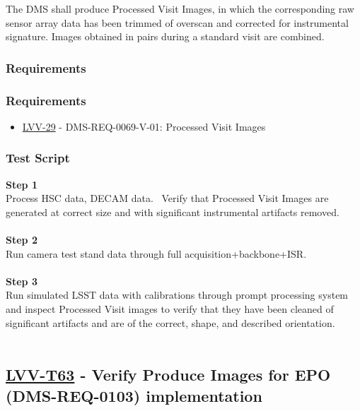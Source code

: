 The DMS shall produce Processed Visit Images, in which the corresponding
raw sensor array data has been trimmed of overscan and corrected for
instrumental signature. Images obtained in pairs during a standard visit
are combined.

\hypertarget{requirements-52}{%
\subsubsection{Requirements}\label{requirements-52}}

\hypertarget{requirements-53}{%
\subsubsection{Requirements}\label{requirements-53}}

\begin{itemize}
\tightlist
\item
  \href{https://jira.lsstcorp.org/browse/LVV-29}{LVV-29} -
  DMS-REQ-0069-V-01: Processed Visit Images
\end{itemize}

\hypertarget{test-script-26}{%
\subsubsection{Test Script}\label{test-script-26}}

\textbf{Step 1}\\
Process HSC data, DECAM data. ~Verify that Processed Visit Images are
generated at correct size and with significant instrumental artifacts
removed.\\
~\\
\textbf{Step 2}\\
Run camera test stand data through full acquisition+backbone+ISR.\\
~\\
\textbf{Step 3}\\
Run simulated LSST data with calibrations through prompt processing
system and inspect Processed Visit images to verify that they have been
cleaned of significant artifacts and are of the correct, shape, and
described orientation.\\
~\\

\hypertarget{lvv-t63---verify-produce-images-for-epo-dms-req-0103-implementation}{%
\subsection{\texorpdfstring{\href{https://jira.lsstcorp.org/secure/Tests.jspa\#/testCase/LVV-T63}{LVV-T63}
- Verify Produce Images for EPO (DMS-REQ-0103)
implementation}{LVV-T63 - Verify Produce Images for EPO (DMS-REQ-0103) implementation}}\label{lvv-t63---verify-produce-images-for-epo-dms-req-0103-implementation}}

